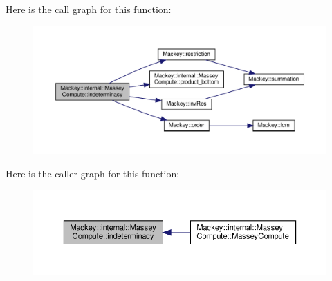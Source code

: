 Here is the call graph for this function\+:\nopagebreak
\begin{figure}[H]
\begin{center}
\leavevmode
\includegraphics[width=350pt]{structMackey_1_1internal_1_1MasseyCompute_a720436488adcfdf1d976b27be7d95b55_cgraph}
\end{center}
\end{figure}
Here is the caller graph for this function\+:\nopagebreak
\begin{figure}[H]
\begin{center}
\leavevmode
\includegraphics[width=350pt]{structMackey_1_1internal_1_1MasseyCompute_a720436488adcfdf1d976b27be7d95b55_icgraph}
\end{center}
\end{figure}
\mbox{\label{structMackey_1_1internal_1_1MasseyCompute_a2a7ff03cfeadb4f35c0798bf2a447a7e}} 
